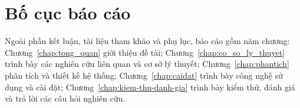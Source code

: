 \section{Bố cục báo cáo}
\label{sec:c1_bo_cuc}

Ngoài phần kết luận, tài liệu tham khảo và phụ lục, báo cáo gồm năm chương: Chương~\ref{chap:tong_quan} giới thiệu đề tài; Chương~\ref{chap:co_so_ly_thuyet} trình bày các nghiên cứu liên quan và cơ sở lý thuyết; Chương~\ref{chap:phantich} phân tích và thiết kế hệ thống; Chương~\ref{chap:caidat} trình bày công nghệ sử dụng và cài đặt; Chương~\ref{chap:kiem-thu-danh-gia} trình bày kiểm thử, đánh giá và trả lời các câu hỏi nghiên cứu.
